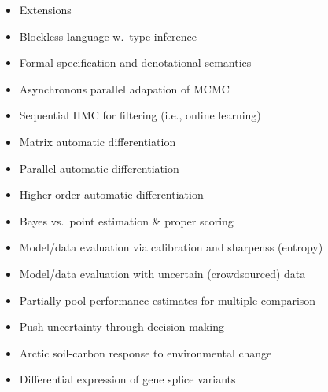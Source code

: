 \documentclass[10pt]{report}
\begin{document}
\begin{itemize}
\item Extensions
\item Blockless language w.\ type inference
\item Formal specification and denotational semantics
\end{itemize}

\begin{itemize}
\item Asynchronous parallel adapation of MCMC
\item Sequential HMC for filtering (i.e., online learning)
\item Matrix automatic differentiation
\item Parallel automatic differentiation
\item Higher-order automatic differentiation
\end{itemize}

\begin{itemize}
\item Bayes vs.\ point estimation \& proper scoring
\item Model/data evaluation via calibration and sharpenss (entropy)
\item Model/data evaluation with uncertain (crowdsourced) data
\item Partially pool performance estimates for multiple comparison
\item Push uncertainty through decision making
\end{itemize}

\begin{itemize}
\item Arctic soil-carbon response to environmental change
\item Differential expression of gene splice variants
\end{itemize}
\end{document}
